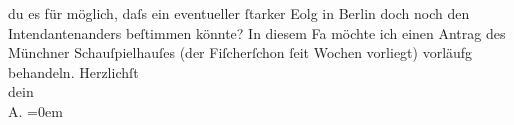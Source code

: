 \begin{ledgroupsized}[t]{13cm}
               du es für möglich, daſs ein eventueller ſtarker Eolg in Berlin doch noch den Intendantenanders beſtimmen könnte? In
               diesem Fa möchte ich einen Antrag des Münchner
                  Schauſpielhauſes (der Fiſcherſchon ſeit
               Wochen vorliegt) vorläufg \label{K_L01581_1v}\label{K_L01581_1h}
               behandeln.\pend
           \pstart
           Herzlichſt{\\[\baselineskip]}dein{\\[\baselineskip]}\spacefill\mbox{A.}\pend
           \leftskip=0em{}\endnumbering{}\end{ledgroupsized}  \newcommand{\dateiname}{L01581}\newcommand{\titel}{Arthur Schnitzler an Hermann Bahr, 3. 2. 1906}\newcommand{\editorInnen}{ Kurt Ifkovits,  Martin Anton Müller}
      